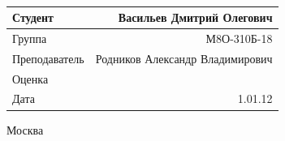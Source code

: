 \documentclass[a4paper,12pt]{article} %
\newcommand{\MAIStudentName}{Васильев Дмитрий Олегович}
\newcommand{\MAITeacherName}{Родников Александр Владимирович}
\newcommand{\MAIGroup}{М8О-310Б-18}
\newcommand{\MAIDate}{1.01.12}
\begin{document}
\begin{titlepage}
	\HRule\\[1.5cm]
	
	
	\vfill\vfill
	
	\begin{minipage}{1\textwidth}
		\begin{flushright}
			\begin{tabular}{|l|r|}
				\hline 
				Студент & \MAIStudentName \\ 
				\hline 
				Группа & \MAIGroup \\ 
				\hline 
				Преподаватель & \MAITeacherName \\ 
				\hline 
				Оценка & \\ 
				\hline 
				Дата & \MAIDate \\ 
				\hline 
			\end{tabular} 
		\end{flushright}
	\end{minipage}
	
	
	
	\vfill\vfill\vfill
	
	{\large Москва \the\year{}} 
	
\end{titlepage}

\end{document}
